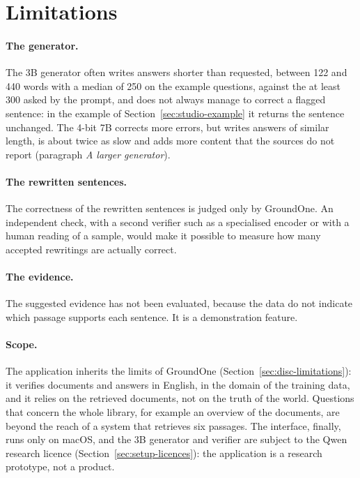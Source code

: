 \section{Limitations}
\label{sec:studio-limits}

\paragraph{The generator.} The 3B generator often writes answers shorter than requested, between 122 and 440 words with a median of 250 on the example questions, against the at least 300 asked by the prompt, and does not always manage to correct a flagged sentence: in the example of Section~\ref{sec:studio-example} it returns the sentence unchanged. The 4-bit 7B corrects more errors, but writes answers of similar length, is about twice as slow and adds more content that the sources do not report (paragraph \emph{A larger generator}).

\paragraph{The rewritten sentences.} The correctness of the rewritten sentences is judged only by GroundOne. An
independent check, with a second verifier such as a specialised encoder or with a human reading of a sample, would make
it possible to measure how many accepted rewritings are actually correct.

\paragraph{The evidence.} The suggested evidence has not been evaluated, because the data do not indicate which passage
supports each sentence. It is a demonstration feature.

\paragraph{Scope.} The application inherits the limits of GroundOne (Section~\ref{sec:disc-limitations}): it verifies
documents and answers in English, in the domain of the training data, and it relies on the retrieved documents, not on
the truth of the world. Questions that concern the whole library, for example an overview of the documents, are beyond
the reach of a system that retrieves six passages. The interface, finally, runs only on macOS, and the 3B generator and
verifier are subject to the Qwen research licence (Section~\ref{sec:setup-licences}): the application is a research
prototype, not a product.
